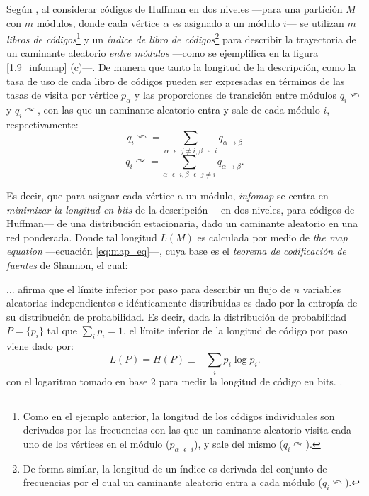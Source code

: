 \documentclass[letterpaper, 11pt]{book}
\theoremstyle{definition}
\theoremstyle{remark}
\begin{document}
Según \citet{2009_Rosvall_MapEquation}, al considerar códigos de Huffman en dos niveles ---para una partición $M$ con $m$ módulos, donde cada vértice $\alpha$ es asignado a un módulo $i$--- se utilizan $m$ \emph{libros de códigos}\footnote{
    Como en el ejemplo anterior, la longitud de los códigos individuales son derivados por las frecuencias con las que un caminante aleatorio visita cada uno de los vértices en el módulo ($p_{\alpha\text{ }\epsilon\text{ }i}$), y sale del mismo ($q_{i}\curvearrowright$). 
} y un \emph{índice de libro de códigos}\footnote{
    De forma similar, la longitud de un índice es derivada del conjunto de frecuencias por el cual un caminante aleatorio entra a cada módulo ($q_{i}\curvearrowleft$). 
} para describir la trayectoria de un caminante aleatorio \emph{entre módulos} ---como se ejemplifica en la figura \ref{1.9_infomap} (c)---.
De manera que tanto la longitud de la descripción, como la tasa de uso de cada libro de códigos pueden ser expresadas en términos de las tasas de visita por vértice $p_{\alpha}$ y las proporciones de transición entre módulos $q_{i}\curvearrowleft$ y $q_{i}\curvearrowright$, con las que un caminante aleatorio entra y sale de cada módulo $i$, respectivamente: 
\begin{equation*}
    q_{i}\curvearrowleft = \sum_{\alpha \text{ }\epsilon\text{ } j\neq i, \beta \text{ }\epsilon\text{ } i} q_{\alpha \rightarrow \beta}
\end{equation*} 
\begin{equation*}
    q_{i}\curvearrowright = \sum_{\alpha \text{ }\epsilon\text{ } i, \beta \text{ }\epsilon\text{ } j\neq i} q_{\alpha \rightarrow \beta}. 
\end{equation*} 

Es decir, que para asignar cada vértice a un módulo, \emph{infomap} se centra en \emph{minimizar la longitud en bits} de la descripción ---en dos niveles, para códigos de Huffman--- de una distribución estacionaria, dado un caminante aleatorio en una red ponderada. 
Donde tal longitud $L(M)$ es calculada por medio de \emph{the map equation} ---ecuación \ref{eq:map_eq}---, cuya base es el \emph{teorema de codificación de fuentes} de Shannon, el cual:
\begin{center}
    \begin{minipage}{0.9\linewidth}
        {\setlength{\parindent}{12pt}\small
        ... afirma que el límite inferior por paso para describir un flujo de $n$ variables aleatorias independientes e idénticamente distribuidas es dado por la entropía de su distribución de probabilidad.
        Es decir, dada la distribución de probabilidad $P = \{p_{i}\}$ tal que $\sum_{i}p_{i} = 1$, el límite inferior de la longitud de código por paso viene dado por: 
        \begin{equation}\label{eq:Shannon}
        L(P) = H(P) \equiv -\sum_{i}p_{i}\log p_{i}.
        \end{equation}
        con el logaritmo tomado en base 2 para medir la longitud de código en bits. \normalsize \citep[8]{2014_Rosvall_CommunityMapEq}.
        }
    \end{minipage}
\end{center}
\end{document}
